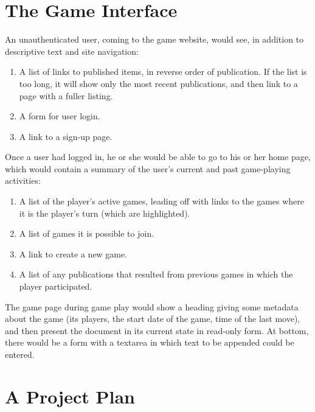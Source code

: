 \documentclass{manual}
\begin{document}
\section{The Game Interface}

An unauthenticated user, coming to the game website, would see, in
addition to descriptive text and site navigation:

\begin{enumerate}

\item A list of links to published items, in reverse order of
publication.  If the list is too long, it will show only the most
recent publications, and then link to a page with a fuller listing.
\item A form for user login.
\item A link to a sign-up page.

\end{enumerate}

Once a user had logged in, he or she would be able to go to his or her
home page, which would contain a summary of the user's current and
past game-playing activities:

\begin{enumerate}

\item A list of the player's active games, leading off with links to
the games where it is the player's turn (which are highlighted). 

\item A list of games it is possible to join.

\item A link to create a new game.

\item A list of any publications that resulted from previous games in
which the player participated.

\end{enumerate}

The game page during game play would show a heading giving some
metadata about the game (its players, the start date of the game, time
of the last move), and then present the document in its current state
in read-only form.  At bottom, there would be a form with a textarea
in which text to be appended could be entered.

\section{A Project Plan}
\end{document}
